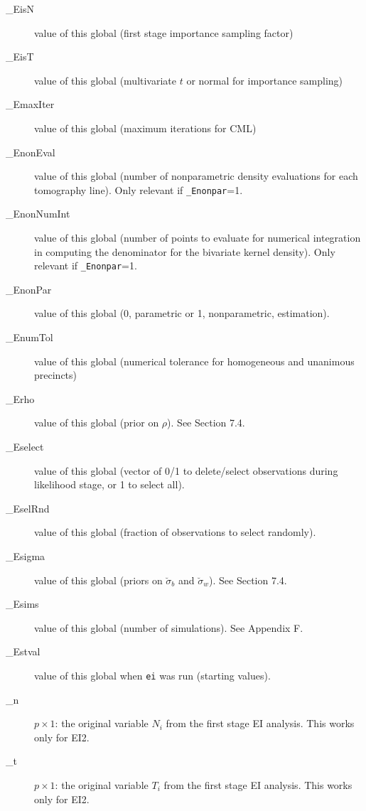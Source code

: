 \documentclass[11pt,titlepage]{article}
\newcommand{\sigmau}{\breve{\sigma}}
\begin{document}
\begin{description}
\item[\_EisN] value of this global (first stage importance sampling
  factor)

\item[\_EisT] value of this global (multivariate $t$ or normal for
  importance sampling)

\item[\_EmaxIter] value of this global (maximum iterations for CML)

\item[\_EnonEval] value of this global (number of nonparametric
  density evaluations for each tomography line).  Only relevant if
  \texttt{\_Enonpar}=1.

\item[\_EnonNumInt] value of this global (number of points to evaluate
  for numerical integration in computing the denominator for the
  bivariate kernel density).  Only relevant if \texttt{\_Enonpar}=1.

\item[\_EnonPar] value of this global (0, parametric or 1,
  nonparametric, estimation).

\item[\_EnumTol] value of this global (numerical tolerance for
  homogeneous and unanimous precincts)

\item[\_Erho] value of this global (prior on $\rho$).  See Section
  7.4.

\item[\_Eselect] value of this global (vector of 0/1 to delete/select
  observations during likelihood stage, or 1 to select all).

\item[\_EselRnd] value of this global (fraction of observations to
  select randomly).

\item[\_Esigma] value of this global (priors on $\sigmau_b$ and
  $\sigmau_w$).  See Section 7.4.

\item[\_Esims] value of this global (number of simulations).  See
  Appendix F.

\item[\_Estval] value of this global when \texttt{ei} was run
  (starting values).

\item[\_n] $p\times 1$: the original variable $N_i$ from the first
  stage EI analysis.  This works only for EI2.

\item[\_t] $p\times 1$: the original variable $T_i$ from the first
  stage EI analysis.  This works only for EI2.


\end{description}
\end{document}

